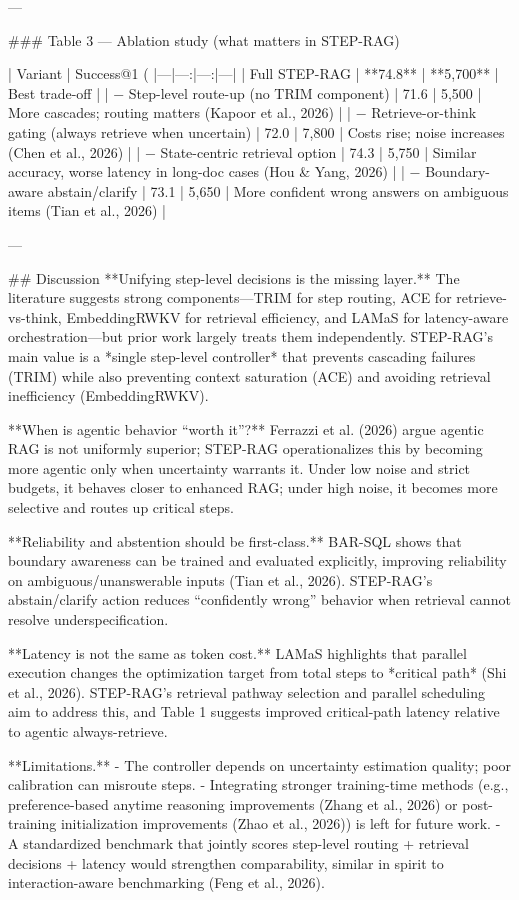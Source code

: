 ---

### Table 3 — Ablation study (what matters in STEP-RAG)  

| Variant | Success@1 (%
|---|---:|---:|---|
| Full STEP-RAG | **74.8** | **5,700** | Best trade-off |
| − Step-level route-up (no TRIM component) | 71.6 | 5,500 | More cascades; routing matters (Kapoor et al., 2026) |
| − Retrieve-or-think gating (always retrieve when uncertain) | 72.0 | 7,800 | Costs rise; noise increases (Chen et al., 2026) |
| − State-centric retrieval option | 74.3 | 5,750 | Similar accuracy, worse latency in long-doc cases (Hou & Yang, 2026) |
| − Boundary-aware abstain/clarify | 73.1 | 5,650 | More confident wrong answers on ambiguous items (Tian et al., 2026) |

---

## Discussion  
**Unifying step-level decisions is the missing layer.** The literature suggests strong components—TRIM for step routing, ACE for retrieve-vs-think, EmbeddingRWKV for retrieval efficiency, and LAMaS for latency-aware orchestration—but prior work largely treats them independently. STEP-RAG’s main value is a *single step-level controller* that prevents cascading failures (TRIM) while also preventing context saturation (ACE) and avoiding retrieval inefficiency (EmbeddingRWKV).

**When is agentic behavior “worth it”?** Ferrazzi et al. (2026) argue agentic RAG is not uniformly superior; STEP-RAG operationalizes this by becoming more agentic only when uncertainty warrants it. Under low noise and strict budgets, it behaves closer to enhanced RAG; under high noise, it becomes more selective and routes up critical steps.

**Reliability and abstention should be first-class.** BAR-SQL shows that boundary awareness can be trained and evaluated explicitly, improving reliability on ambiguous/unanswerable inputs (Tian et al., 2026). STEP-RAG’s abstain/clarify action reduces “confidently wrong” behavior when retrieval cannot resolve underspecification.

**Latency is not the same as token cost.** LAMaS highlights that parallel execution changes the optimization target from total steps to *critical path* (Shi et al., 2026). STEP-RAG’s retrieval pathway selection and parallel scheduling aim to address this, and Table 1 suggests improved critical-path latency relative to agentic always-retrieve.

**Limitations.**  
- The controller depends on uncertainty estimation quality; poor calibration can misroute steps.  
- Integrating stronger training-time methods (e.g., preference-based anytime reasoning improvements (Zhang et al., 2026) or post-training initialization improvements (Zhao et al., 2026)) is left for future work.  
- A standardized benchmark that jointly scores step-level routing + retrieval decisions + latency would strengthen comparability, similar in spirit to interaction-aware benchmarking (Feng et al., 2026).

